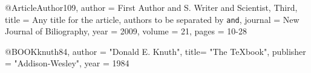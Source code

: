 @Article{Author109,
  author       = {First Author and S. Writer and Scientist, Third},
  title	       = {Any title for the article, authors to be separated
                  by \verb|and|},
  journal      = {New Journal of Biliography},
  year	       = 2009,
  volume       = 21,
  pages	       = {10-28}
}

@BOOK{knuth84,
   author = "Donald E. Knuth",
   title= "The {{\TeX}book}",
   publisher = "Addison-Wesley",
   year = 1984
   }


